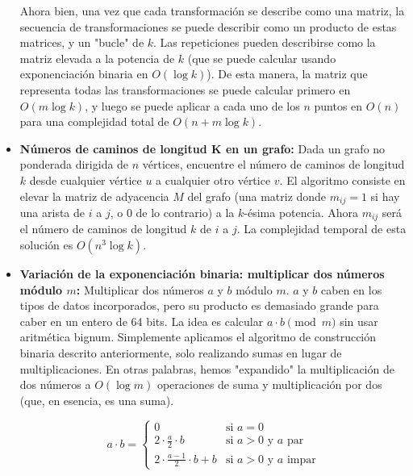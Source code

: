 \begin{itemize}
Ahora bien, una vez que cada transformación se describe como una matriz, la secuencia de transformaciones se puede describir como un producto de estas matrices, y un "bucle" de $k$. Las repeticiones pueden describirse como la matriz elevada a la potencia de $k$ (que se puede calcular usando exponenciación binaria en $O(\log{k})$). De esta manera, la matriz que representa todas las transformaciones se puede calcular primero en $O(m\log{k})$, y luego se puede aplicar a cada uno de los $n$ puntos en $O(n)$ para una complejidad total de $O(n + m\log{k})$.
	
	\item \textbf{Números de caminos de longitud K en un grafo:} Dada un grafo no ponderada dirigida de 
	$n$ vértices, encuentre el número de caminos de longitud $k$ desde cualquier vértice $u$ a 
	cualquier otro vértice $v$.  El algoritmo consiste en elevar la matriz de adyacencia $M$ del grafo 
	(una matriz donde $m_{ij} = 1$ si hay una arista de $i$ a $j$, o $0$ de lo contrario) a la 
	$k$-ésima potencia. Ahora $m_{ij}$ será el número de caminos de longitud $k$ de $i$ a $j$. La 
	complejidad temporal de esta solución es $O(n^3 \log k)$.
	
	\item  \textbf{Variación de la exponenciación binaria: multiplicar dos números módulo $m$:} 
	Multiplicar dos números $a$ y $b$ módulo $m$. $a$ y $b$ caben en los tipos de datos incorporados, 
	pero su producto es demasiado grande para caber en un entero de 64 bits. La idea es calcular $a 
	\cdot b \pmod m$ sin usar aritmética bignum. Simplemente aplicamos el algoritmo de construcción 
	binaria descrito anteriormente, solo realizando sumas en lugar de multiplicaciones. En otras 
	palabras, hemos "expandido" la multiplicación de dos números a $O (\log m)$ operaciones de suma y 
	multiplicación por dos (que, en esencia, es una suma).
	
$$
a \cdot b = 
\begin{cases}
  0 &\text{si }a = 0 \\ 
  2 \cdot \frac{a}{2} \cdot b &\text{si }a > 0 \text{ y } a \text{ par} \\ 
  2 \cdot \frac{a-1}{2} \cdot b + b &\text{si }a > 0 \text{ y }a \text{ impar} 
\end{cases}
$$
\end{itemize}  